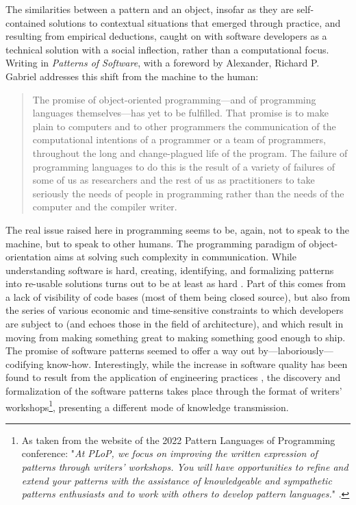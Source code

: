 The similarities between a pattern and an object, insofar as they are self-contained solutions to contextual situations that emerged through practice, and resulting from empirical deductions, caught on with software developers as a technical solution with a social inflection, rather than a computational focus. Writing in \emph{Patterns of Software}, with a foreword by Alexander, Richard P. Gabriel addresses this shift from the machine to the human:

\begin{quote}
    The promise of object-oriented programming—and of programming languages themselves—has yet to be fulfilled. That promise is to make plain to computers and to other programmers the communication of the computational intentions of a programmer or a team of programmers, throughout the long and change-plagued life of the program. The failure of programming languages to do this is the result of a variety of failures of some of us as researchers and the rest of us as practitioners to take seriously the needs of people in programming rather than the needs of the computer and the compiler writer. \citep{gabriel_patterns_1998}
\end{quote}

The real issue raised here in programming seems to be, again, not to speak to the machine, but to speak to other humans. The programming paradigm of object-orientation aims at solving such complexity in communication. While understanding software is hard, creating, identifying, and formalizing patterns into re-usable solutions turns out to be at least as hard \citep{taylor_patterns_2001}. Part of this comes from a lack of visibility of code bases (most of them being closed source), but also from the series of various economic and time-sensitive constraints to which developers are subject to (and echoes those in the field of architecture), and which result in moving from making something great to making something good enough to ship. The promise of software patterns seemed to offer a way out by—laboriously—codifying know-how. Interestingly, while the increase in software quality has been found to result from the application of engineering practices \citep{hoare_how_1996}, the discovery and formalization of the software patterns takes place through the format of writers' workshops\footnote{As taken from the website of the 2022 Pattern Languages of Programming conference: "\emph{At PLoP, we focus on improving the written expression of patterns through writers' workshops. You will have opportunities to refine and extend your patterns with the assistance of knowledgeable and sympathetic patterns enthusiasts and to work with others to develop pattern languages.}" \citep{guerra_plop_2022}.}, presenting a different mode of knowledge transmission.


